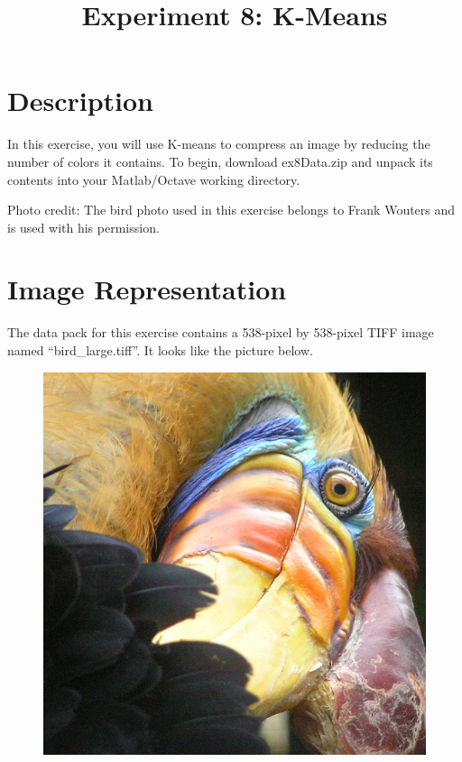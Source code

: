 \documentclass[10pt,a4paper]{article}
\begin{document}
\title{Experiment 8: K-Means}

\maketitle
  
\section{Description}
%
  In this exercise, you will use K-means to compress an image by reducing the number of colors it contains. To begin, download ex8Data.zip and unpack its contents into your Matlab/Octave working directory.

  Photo credit: The bird photo used in this exercise belongs to Frank Wouters and is used with his permission.
  


\section{Image Representation}
%
  The data pack for this exercise contains a 538-pixel by 538-pixel TIFF image named ``bird\_large.tiff''. It looks like the picture below.
  \begin{figure}[htb!]
    \centering
      \includegraphics[width=.7\columnwidth]{bird_large}
  \end{figure}
  
\end{document}
